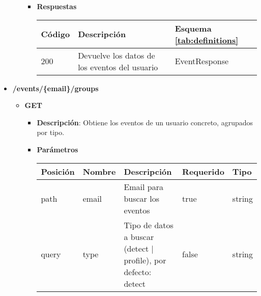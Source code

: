 \begin{itemize}
\begin{itemize}
\begin{itemize}
                        \item \textbf{Respuestas}
                        
                        
                            \begin{table}[!h]
                                \centering
                                \begin{tabular}{ l  l  l } 
                                    \toprule
                                     Código & Descripción & Esquema \ref{tab:definitions}\\ 
                                     \midrule
                                    200 & Devuelve los datos de los eventos del usuario & EventResponse \\  
                                    \bottomrule
                                \end{tabular} 
                            \end{table}
                            
                            
                    \end{itemize} 
            \end{itemize} 
\newpage      
\item \textbf{/events/\{email\}/groups}
    \begin{itemize} 
         \item \textbf{GET} 
             \begin{itemize} 
                \item \textbf{Descripción}: Obtiene los eventos de un usuario concreto, agrupados por tipo.
             
                \item \textbf{Parámetros}
                \begin{table}[h]
                    \centering
                    \begin{tabular}{ l l p{5cm} l l} 
                        \toprule
                        Posición & Nombre & Descripción & Requerido & Tipo \\ 
                        \midrule
                        path & email & Email para buscar los eventos  & true & string \\ 
                        query & type & Tipo de datos a buscar (detect | profile), por defecto: detect & false & string \\  
                        \bottomrule
                     \end{tabular} 
                \end{table}
            

\end{itemize}
\end{itemize}
\end{itemize}
